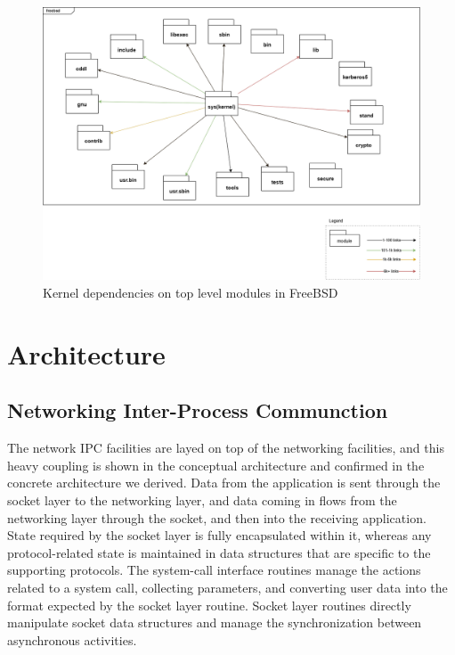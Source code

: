 \documentclass[12pt, dvipsnames, a4paper]{article}
\begin{document}
\begin{figure}[!htb]
	\center
	\includegraphics[width = 390pt]{assets/kernel-dependencies.png}
	\caption{Kernel dependencies on top level modules in FreeBSD}
\end{figure}
\clearpage
\section{Architecture}
\subsection{Networking Inter-Process Communction}
The network IPC facilities are layed on top of the networking facilities, and this heavy coupling is shown in the conceptual architecture and confirmed in the concrete architecture we derived. Data from the application is sent through the socket layer to the networking layer, and data coming in flows from the networking layer through the socket, and then into the receiving application.  State required by the socket layer is fully encapsulated within it, whereas any protocol-related state is maintained in data structures that are specific to the supporting protocols. The system-call interface routines manage the actions related to a system call, collecting parameters, and converting user data into the format expected by the socket layer routine. Socket layer routines directly manipulate socket data structures and manage the synchronization between asynchronous activities.
\end{document}
